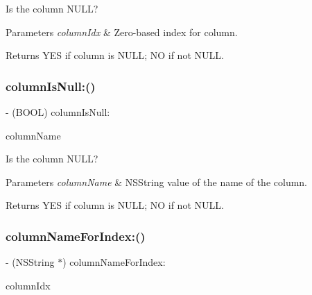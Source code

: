 Is the column {\ttfamily N\+U\+LL}?


\begin{DoxyParams}{Parameters}
{\em column\+Idx} & Zero-\/based index for column.\\
\hline
\end{DoxyParams}
\begin{DoxyReturn}{Returns}
{\ttfamily Y\+ES} if column is {\ttfamily N\+U\+LL}; {\ttfamily NO} if not {\ttfamily N\+U\+LL}. 
\end{DoxyReturn}
\mbox{\label{interface_o_p_t_l_y_f_m_d_b_result_set_a110b4b8b0c9fd97fd591c3354139900a}} 
\subsubsection{\texorpdfstring{column\+Is\+Null\+:()}{columnIsNull:()}}
{\footnotesize\ttfamily -\/ (B\+O\+OL) column\+Is\+Null\+: \begin{DoxyParamCaption}\item[{(N\+S\+String$\ast$)}]{column\+Name }\end{DoxyParamCaption}}

Is the column {\ttfamily N\+U\+LL}?


\begin{DoxyParams}{Parameters}
{\em column\+Name} & {\ttfamily N\+S\+String} value of the name of the column.\\
\hline
\end{DoxyParams}
\begin{DoxyReturn}{Returns}
{\ttfamily Y\+ES} if column is {\ttfamily N\+U\+LL}; {\ttfamily NO} if not {\ttfamily N\+U\+LL}. 
\end{DoxyReturn}
\mbox{\label{interface_o_p_t_l_y_f_m_d_b_result_set_ac153e81c5ea4d8ba8a09ccd60c8841b5}} 
\subsubsection{\texorpdfstring{column\+Name\+For\+Index\+:()}{columnNameForIndex:()}}
{\footnotesize\ttfamily -\/ (N\+S\+String $\ast$) column\+Name\+For\+Index\+: \begin{DoxyParamCaption}\item[{(int)}]{column\+Idx }\end{DoxyParamCaption}}

